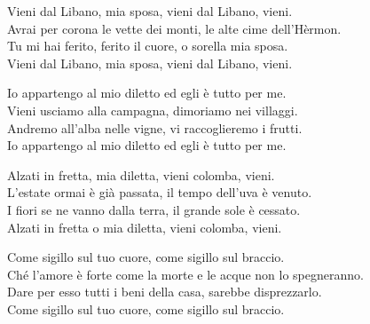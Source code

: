 
\strofa Vieni dal Libano, mia sposa, vieni dal Libano, vieni.\\
Avrai per corona le vette dei monti, le alte cime dell'Hèrmon.\\
Tu mi hai ferito, ferito il cuore, o sorella mia sposa.\\
Vieni dal Libano, mia sposa, vieni dal Libano, vieni.

\spazio


\spazio

\strofa Io appartengo al mio diletto ed egli è tutto per me.\\
Vieni usciamo alla campagna, dimoriamo nei villaggi.\\
Andremo all'alba nelle vigne, vi raccoglieremo i frutti.\\
Io appartengo al mio diletto ed egli è tutto per me.

\spazio


\spazio

\strofa Alzati in fretta, mia diletta, vieni colomba, vieni.\\
L'estate ormai è già passata,  il tempo dell'uva è venuto.\\
I fiori se ne vanno dalla terra, il grande sole è cessato.\\
Alzati in fretta o mia diletta, vieni colomba, vieni.

\spazio


\spazio

\strofa Come sigillo sul tuo cuore, come sigillo sul braccio.\\
Ché l'amore è forte come la morte e le acque non lo spegneranno.\\
Dare per esso tutti i beni della casa, sarebbe disprezzarlo.\\
Come sigillo sul tuo cuore, come sigillo sul braccio.

\spazio

